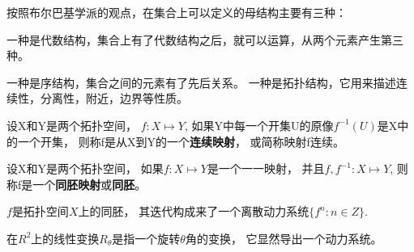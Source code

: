 按照布尔巴基学派的观点，在集合上可以定义的母结构主要有三种：


一种是代数结构，集合上有了代数结构之后，就可以运算，从两个元素产生第三种。


一种是序结构，集合之间的元素有了先后关系。
一种是拓扑结构，它用来描述连续性，分离性，附近，边界等性质。

\begin{Defination}
设X和Y是两个拓扑空间，
\(f:X\mapsto Y\),
如果Y中每一个开集U的原像\(f^{-1}(U)\)是X中的一个开集，
则称f是从X到Y的一个\textbf{连续映射}，
或简称映射f连续。
\end{Defination}

\begin{Defination}
设X和Y是两个拓扑空间，
如果\(f:X\mapsto Y\)是一个一一映射，
并且\(f,f^{-1}:X\mapsto Y\),
则称f是一个\textbf{同胚映射}或\textbf{同胚}。
\end{Defination}

\begin{Defination}[离散动力系统]
\(f\)是拓扑空间\(X\)上的同胚，
其迭代构成来了一个离散动力系统\(\{f^n:n\in Z\}\).
\end{Defination}


在\(R^2\)上的线性变换\(R_{\theta}\)是指一个旋转\(\theta\)角的变换，
它显然导出一个动力系统。


